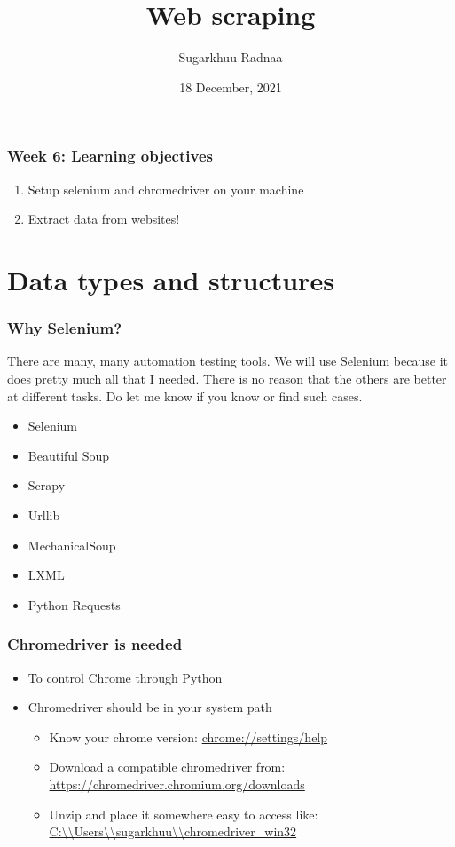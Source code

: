 \documentclass{beamer}
\title[Introduction to Python]{Web scraping}
\author{Sugarkhuu Radnaa}
\institute[]
{
Py4Econ in Ulaanbaatar \\ 
\medskip
\textit{py4econ@gmail.com} 
}
\date{18 December, 2021}  %
\begin{document}
\begin{frame}
\titlepage %
\end{frame}

\begin{frame}
    \frametitle{Week 6: Learning objectives}
    \begin{enumerate}
        \item Setup selenium and chromedriver on your machine
        \item Extract data from websites!
    \end{enumerate}
\end{frame}

\section{Data types and structures} 

\begin{frame}
    \frametitle{Why Selenium?}

    There are many, many automation testing tools. We will use Selenium because it does pretty much all that I needed. There is no reason
    that the others are better at different tasks. Do let me know if you know or find such cases. 

    \begin{itemize}
        \item Selenium
        \item Beautiful Soup
        \item Scrapy
        \item Urllib
        \item MechanicalSoup
        \item LXML
        \item Python Requests
    \end{itemize}
\end{frame}


\begin{frame}
\frametitle{Chromedriver is needed}
    \begin{itemize}
        \item To control Chrome through Python
        \item Chromedriver should be in your system path
            \begin{itemize}
                \item Know your chrome version: \url{chrome://settings/help}
                \item Download a compatible chromedriver from: \url{https://chromedriver.chromium.org/downloads}
                \item Unzip and place it somewhere easy to access like: \url{C:\\Users\\sugarkhuu\\chromedriver\_win32}
            \end{itemize}
    \end{itemize}
\end{frame}
\end{document}
